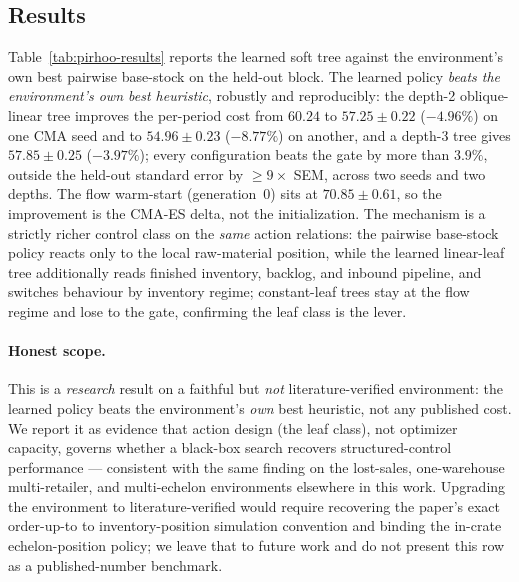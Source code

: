 \subsection{Results}
\label{sec:pirhoo-results}

Table~\ref{tab:pirhoo-results} reports the learned soft tree against the environment's own best
pairwise base-stock on the held-out block. The learned policy \emph{beats the environment's own best
heuristic}, robustly and reproducibly: the depth-2 oblique-linear tree improves the per-period cost
from $60.24$ to $57.25\pm0.22$ ($-4.96\%$) on one CMA seed and to $54.96\pm0.23$ ($-8.77\%$) on
another, and a depth-3 tree gives $57.85\pm0.25$ ($-3.97\%$); every configuration beats the gate by
more than $3.9\%$, outside the held-out standard error by $\ge 9\times$ SEM, across two seeds and two
depths. The flow warm-start (generation~0) sits at $70.85\pm0.61$, so the improvement is the CMA-ES
delta, not the initialization. The mechanism is a strictly richer control class on the \emph{same}
action relations: the pairwise base-stock policy reacts only to the local raw-material position, while
the learned linear-leaf tree additionally reads finished inventory, backlog, and inbound pipeline, and
switches behaviour by inventory regime; constant-leaf trees stay at the flow regime and lose to the
gate, confirming the leaf class is the lever.

\paragraph{Honest scope.}
This is a \emph{research} result on a faithful but \emph{not} literature-verified environment: the
learned policy beats the environment's \emph{own} best heuristic, not any published cost. We report it
as evidence that action design (the leaf class), not optimizer capacity, governs whether a black-box
search recovers structured-control performance --- consistent with the same finding on the lost-sales,
one-warehouse multi-retailer, and multi-echelon environments elsewhere in this work. Upgrading the
environment to literature-verified would require recovering the paper's exact order-up-to to
inventory-position simulation convention and binding the in-crate echelon-position policy; we leave
that to future work and do not present this row as a published-number benchmark.

